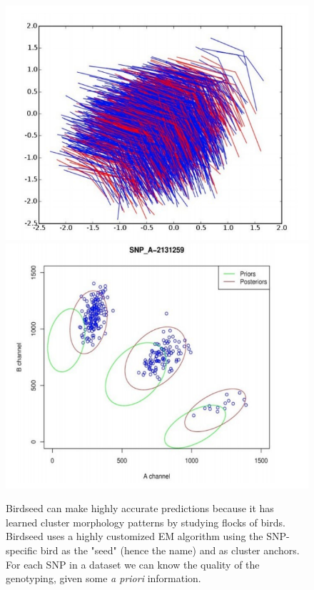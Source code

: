 			\begin{figure}[H]
				\centering
				\includegraphics[scale=0.3]{bird1}
				\includegraphics[scale=0.3]{bird2}
				\caption{Birdseed can make highly accurate predictions because it has learned cluster morphology patterns by studying flocks of birds.\\
				Birdseed uses a highly customized EM algorithm using the SNP-specific bird as the "seed" (hence the name) and as cluster anchors. For each SNP in a dataset we can know the quality of the genotyping, given some \textit{a priori} information. }
				\label{fig:birdseed1}
				\end{figure}
			

